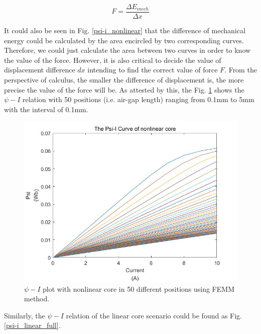 \documentclass[a4paper]{IEEEtran}
\begin{document}
{\begin{equation}
  F=\frac{\Delta E_{mech}}{\Delta x} \label{f formula}
\end{equation}

It could also be seen in Fig. \ref{psi-i_nonlinear} that the difference of mechanical energy could be calculated
by the area encircled by two corresponding curves. Therefore, we could just calculate the area between two curves
in order to know the value of the force. However, it is also critical to decide the value of displacement difference $dx$ 
intending to  find the correct value of force $F$. From the perspective of calculus, the smaller the difference of 
displacement is, the more precise the value of the force will be. As attested by this, the Fig. \ref{psi-i_nonlinear_full}
shows the $\psi-I$ relation with 50 positions (i.e. air-gap length) ranging from 0.1mm to 5mm with the
interval of 0.1mm. 

\begin{figure}[!ht]
\begin{centering}
\includegraphics[scale=0.3]{psi-i_nonlinear_full.jpg}
\par\end{centering}   
\caption{$\psi-I$ plot with nonlinear core in 50 different positions using FEMM method.\label{psi-i_nonlinear_full}}
\end{figure}  

Similarly, the $\psi-I$ relation of the linear core scenario could be found as Fig. \ref{psi-i_linear_full}.

}
\end{document}
